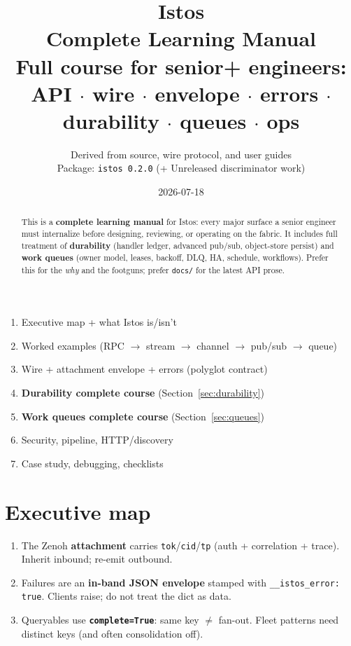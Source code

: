 \documentclass[11pt,a4paper]{article}
\title{\textbf{Istos}\\[0.35em]
\large Complete Learning Manual\\[0.45em]
\normalsize Full course for senior+ engineers:\\
API $\cdot$ wire $\cdot$ envelope $\cdot$ errors $\cdot$
\textbf{durability} $\cdot$ \textbf{queues} $\cdot$ ops}
\author{Derived from source, wire protocol, and user guides\\
Package: \texttt{istos~0.2.0} (+ Unreleased discriminator work)}
\date{2026-07-18}
\begin{document}
\maketitle

\begin{abstract}
\noindent
This is a \textbf{complete learning manual} for Istos: every major surface a
senior engineer must internalize before designing, reviewing, or operating on the
fabric. It includes full treatment of \textbf{durability} (handler ledger,
advanced pub/sub, object-store persist) and \textbf{work queues} (owner model,
leases, backoff, DLQ, HA, schedule, workflows). Prefer this for the \emph{why}
and the footguns; prefer \texttt{docs/} for the latest API prose.
\end{abstract}

\begin{keybox}
\begin{enumerate}[leftmargin=*,itemsep=1pt]
  \item Executive map + what Istos is/isn't
  \item Worked examples (RPC $\to$ stream $\to$ channel $\to$ pub/sub $\to$ queue)
  \item Wire + attachment envelope + errors (polyglot contract)
  \item \textbf{Durability complete course} (Section~\ref{sec:durability})
  \item \textbf{Work queues complete course} (Section~\ref{sec:queues})
  \item Security, pipeline, HTTP/discovery
  \item Case study, debugging, checklists
\end{enumerate}
\end{keybox}

\tableofcontents
\newpage

\section{Executive map}

\begin{keybox}
\begin{enumerate}[leftmargin=*,itemsep=2pt]
  \item The Zenoh \textbf{attachment} carries \texttt{tok}/\texttt{cid}/\texttt{tp}
        (auth + correlation + trace). Inherit inbound; re-emit outbound.
  \item Failures are an \textbf{in-band JSON envelope} stamped with
        \texttt{\_\_istos\_error: true}. Clients raise; do not treat the dict as data.
  \item Queryables use \textbf{\texttt{complete=True}}: same key $\neq$ fan-out.
        Fleet patterns need distinct keys (and often consolidation off).
\end{enumerate}
\end{keybox}
\end{document}
